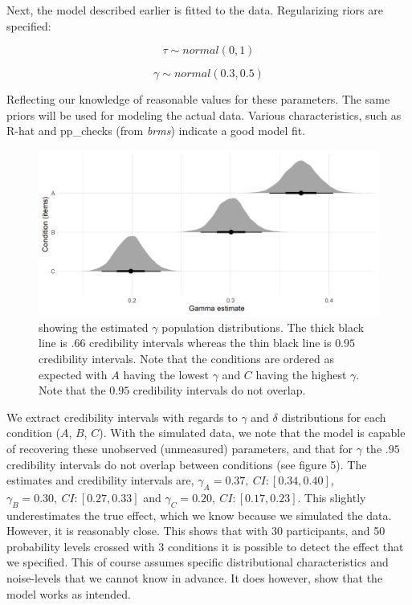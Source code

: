 \documentclass[12pt]{article}
\begin{document}
Next, the model described earlier is fitted
to the data. Regularizing riors are specified:

\[
	\tau \sim normal(0, 1)
\]

\[
	\gamma \sim normal(0.3, 0.5)
\]

Reflecting our knowledge of reasonable values for
these parameters. The same priors will be used for
modeling the actual data. Various characteristics,
such as R-hat and pp\_checks (from \emph{brms})
indicate a good model fit. \\

\begin{figure}[H]
	\includegraphics[width = \linewidth]{../Figures/gamma.png}
	\caption{showing the estimated  $\gamma$
	population distributions. The thick
	black line is  $.66$ credibility intervals
	whereas the thin black line is  $0.95$
	credibility intervals. Note that the
	conditions are ordered as expected with
	 $A$ having the lowest  $\gamma$ and
	 $C$ having the highest  $\gamma$.
	 Note that the  $0.95$ credibility
	 intervals do not overlap.}
 \end{figure}

We extract credibility intervals with regards
to $\gamma$ and $\delta$ distributions for each
condition ($A$, $B$, $C$). With the simulated
data, we note that the model is capable of
recovering these unobserved (unmeasured) parameters,
and that for $\gamma$ the  $.95$ credibility
intervals do not overlap between conditions
(see figure 5). The estimates and credibility intervals
are, $\gamma_{A} = 0.37, \: CI: [0.34, 0.40]$,
$\gamma_{B} = 0.30, \: CI: [0.27, 0.33]$ and
$\gamma_{C} = 0.20, \: CI: [0.17, 0.23]$.
This slightly underestimates the true effect, which
we know because we simulated the data. However, it
is reasonably close. This shows that with $30$
participants, and 50 probability levels crossed with
3 conditions it is possible to detect the effect
that we specified. This of course assumes specific
distributional characteristics and noise-levels
that we cannot know in advance. It does however, show
that the model works as intended.
\end{document}
